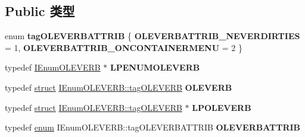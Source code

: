 \subsection*{Public 类型}
\begin{DoxyCompactItemize}
\item 
\mbox{\label{interface_i_enum_o_l_e_v_e_r_b_ab753f9a364e428299dd0358df9f5c2c0}} 
enum {\bfseries tag\+O\+L\+E\+V\+E\+R\+B\+A\+T\+T\+R\+IB} \{ {\bfseries O\+L\+E\+V\+E\+R\+B\+A\+T\+T\+R\+I\+B\+\_\+\+N\+E\+V\+E\+R\+D\+I\+R\+T\+I\+ES} = 1, 
{\bfseries O\+L\+E\+V\+E\+R\+B\+A\+T\+T\+R\+I\+B\+\_\+\+O\+N\+C\+O\+N\+T\+A\+I\+N\+E\+R\+M\+E\+NU} = 2
 \}
\item 
\mbox{\label{interface_i_enum_o_l_e_v_e_r_b_a634e6c21f914b97898efa4a48128661f}} 
typedef \hyperlink{interface_i_enum_o_l_e_v_e_r_b}{I\+Enum\+O\+L\+E\+V\+E\+RB} $\ast$ {\bfseries L\+P\+E\+N\+U\+M\+O\+L\+E\+V\+E\+RB}
\item 
\mbox{\label{interface_i_enum_o_l_e_v_e_r_b_a890d657cca494c7f6f1be6cfbc4bcc8d}} 
typedef \hyperlink{interfacestruct}{struct} \hyperlink{struct_i_enum_o_l_e_v_e_r_b_1_1tag_o_l_e_v_e_r_b}{I\+Enum\+O\+L\+E\+V\+E\+R\+B\+::tag\+O\+L\+E\+V\+E\+RB} {\bfseries O\+L\+E\+V\+E\+RB}
\item 
\mbox{\label{interface_i_enum_o_l_e_v_e_r_b_a942bca104600ddc7102ad0a9e3bf3dc1}} 
typedef \hyperlink{interfacestruct}{struct} \hyperlink{struct_i_enum_o_l_e_v_e_r_b_1_1tag_o_l_e_v_e_r_b}{I\+Enum\+O\+L\+E\+V\+E\+R\+B\+::tag\+O\+L\+E\+V\+E\+RB} $\ast$ {\bfseries L\+P\+O\+L\+E\+V\+E\+RB}
\item 
\mbox{\label{interface_i_enum_o_l_e_v_e_r_b_a898119f63f25b9bb2768a61716219468}} 
typedef \hyperlink{interfaceenum}{enum} I\+Enum\+O\+L\+E\+V\+E\+R\+B\+::tag\+O\+L\+E\+V\+E\+R\+B\+A\+T\+T\+R\+IB {\bfseries O\+L\+E\+V\+E\+R\+B\+A\+T\+T\+R\+IB}
\end{DoxyCompactItemize}

